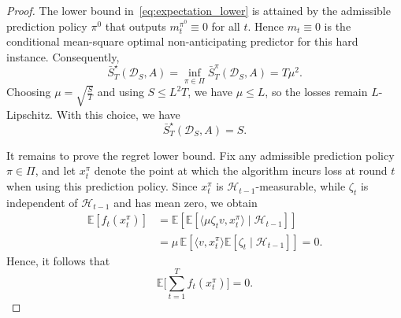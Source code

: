 \documentclass[journal,onecolumn]{IEEEtran}
\theoremstyle{plain}
\theoremstyle{definition}
\theoremstyle{remark}
\begin{document}
{\begin{proof}
The lower bound in~\eqref{eq:expectation_lower} is attained by the
admissible prediction policy $\pi^0$ that outputs
$m_t^{\pi^0}\equiv 0$ for all $t$. Hence $m_t\equiv0$ is the
conditional mean-square optimal non-anticipating predictor for this hard
instance. Consequently,
\begin{equation*}
    \bar S_T^\star(\mathcal D_S,A)
    =
    \inf_{\pi\in\Pi}
    \bar S_T^\pi(\mathcal D_S,A)
    =
    T\mu^2 .
\end{equation*}
Choosing $\mu=\sqrt{\frac{S}{T}}$ and using $S\le L^2T$, we have $\mu\le L$, so the losses remain
$L$-Lipschitz. With this choice, we have
\begin{equation*}
    \bar S_T^\star(\mathcal D_S,A)=S .
\end{equation*}

It remains to prove the regret lower bound. Fix any admissible prediction policy
$\pi\in\Pi$, and let $x_t^\pi$ denote the point at which the algorithm incurs loss at
round $t$ when using this prediction policy. Since $x_t^\pi$ is
$\mathcal H_{t-1}$-measurable, while $\zeta_t$ is independent of $\mathcal H_{t-1}$
and has mean zero, we obtain
\begin{equation*}
\begin{aligned}
    \mathbb E[f_t(x_t^\pi)]
    &=
    \mathbb E
    \left[
        \mathbb E[
            \langle \mu\zeta_t v,x_t^\pi\rangle
            \mid \mathcal H_{t-1}
        ]
    \right]  \\
    &=
    \mu\,
    \mathbb E
    \left[
        \langle v,x_t^\pi\rangle
        \mathbb E[\zeta_t\mid\mathcal H_{t-1}]
    \right]
    =
    0.
\end{aligned}
\end{equation*}
Hence, it follows that
\begin{equation*}
    \mathbb E\Big[\sum_{t=1}^T f_t(x_t^\pi)\Big]=0.
\end{equation*}


\end{proof}}
\end{document}

